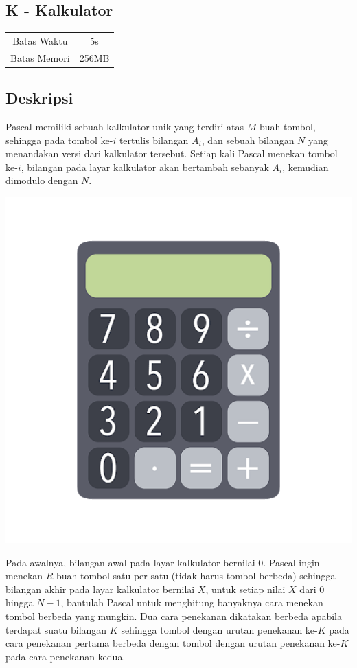 \documentclass{article}
\begin{document}
\begin{center}
    \section*{K - Kalkulator} %

    \begin{tabular}{ | c c | }
        \hline
        Batas Waktu  & 5s \\    %
        Batas Memori & 256MB \\  %
        \hline
    \end{tabular}
\end{center}

\subsection*{Deskripsi}
Pascal memiliki sebuah kalkulator unik yang terdiri atas $M$ buah tombol, sehingga pada tombol ke-$i$ tertulis bilangan $A_{i}$, dan sebuah bilangan $N$ yang menandakan versi dari kalkulator tersebut. Setiap kali Pascal menekan tombol ke-$i$, bilangan pada layar kalkulator akan bertambah sebanyak $A_{i}$, kemudian dimodulo dengan $N$.
\begin{center}
\includegraphics[scale=0.24]{kalkulator.png}
\end{center}
Pada awalnya, bilangan awal pada layar kalkulator bernilai 0. Pascal ingin menekan $R$ buah tombol satu per satu (tidak harus tombol berbeda) sehingga bilangan akhir pada layar kalkulator bernilai $X$, untuk setiap nilai $X$ dari $0$ hingga $N-1$, bantulah Pascal untuk menghitung banyaknya cara menekan tombol berbeda yang mungkin. Dua cara penekanan dikatakan berbeda apabila terdapat suatu bilangan $K$ sehingga tombol dengan urutan penekanan ke-$K$ pada cara penekanan pertama berbeda dengan tombol dengan urutan penekanan ke-$K$ pada cara penekanan kedua.
\end{document}
